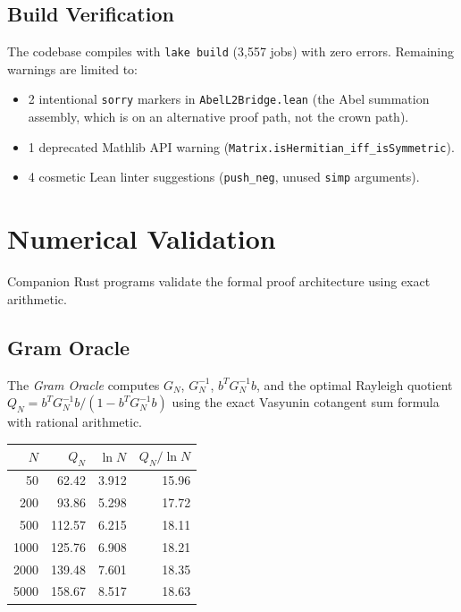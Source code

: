 \documentclass[11pt,a4paper]{article}
\theoremstyle{plain}
\theoremstyle{definition}
\theoremstyle{remark}
\newcommand{\lean}[1]{\texttt{#1}}
\begin{document}
\subsection{Build Verification}

The codebase compiles with \lean{lake build} (3,557 jobs) with zero
errors. Remaining warnings are limited to:
\begin{itemize}
  \item 2 intentional \lean{sorry} markers in \lean{AbelL2Bridge.lean}
    (the Abel summation assembly, which is on an alternative proof
    path, not the crown path).
  \item 1 deprecated Mathlib API warning (\lean{Matrix.isHermitian\_iff\_isSymmetric}).
  \item 4 cosmetic Lean linter suggestions (\lean{push\_neg}, unused
    \lean{simp} arguments).
\end{itemize}

\section{Numerical Validation}
\label{sec:numerical}

Companion Rust programs validate the formal proof architecture using
exact arithmetic.

\subsection{Gram Oracle}

The \emph{Gram Oracle} computes $G_N$, $G_N^{-1}$, $b^T G_N^{-1} b$,
and the optimal Rayleigh quotient $Q_N = b^T G_N^{-1} b / (1 - b^T G_N^{-1} b)$
using the exact Vasyunin cotangent sum formula with rational arithmetic.

\begin{center}
\begin{tabular}{@{}rrcr@{}}
\toprule
$N$ & $Q_N$ & $\ln N$ & $Q_N / \ln N$ \\
\midrule
50 & 62.42 & 3.912 & 15.96 \\
200 & 93.86 & 5.298 & 17.72 \\
500 & 112.57 & 6.215 & 18.11 \\
1000 & 125.76 & 6.908 & 18.21 \\
2000 & 139.48 & 7.601 & 18.35 \\
5000 & 158.67 & 8.517 & 18.63 \\
\bottomrule
\end{tabular}
\end{center}
\end{document}
